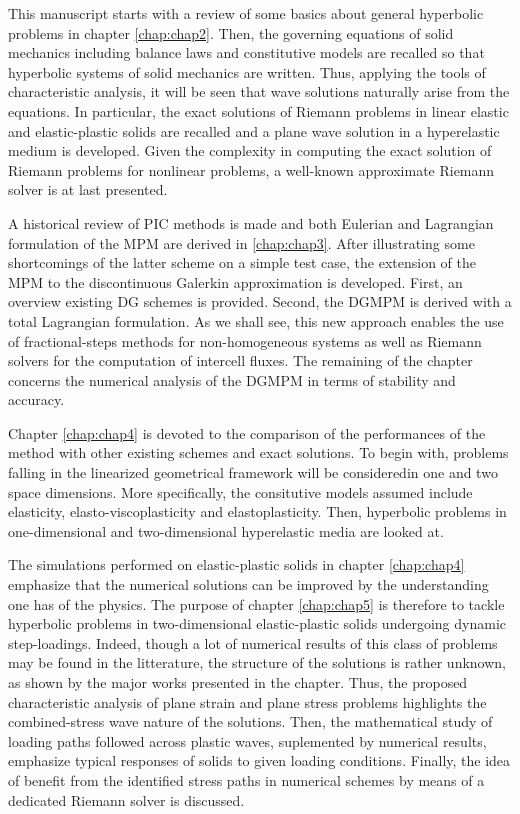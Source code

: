 This manuscript starts with a review of some basics about general hyperbolic problems in chapter \ref{chap:chap2}.
Then, the governing equations of solid mechanics including balance laws and constitutive models are recalled so that hyperbolic systems of solid mechanics are written.
Thus, applying the tools of characteristic analysis, it will be seen that wave solutions naturally arise from the equations. %
In particular, the exact solutions of Riemann problems in linear elastic and elastic-plastic solids are recalled and a plane wave solution in a hyperelastic medium is developed.
Given the complexity in computing the exact solution of Riemann problems for nonlinear problems, a well-known approximate Riemann solver is at last presented.


A historical review of PIC methods is made and both Eulerian and Lagrangian formulation of the MPM are derived in \ref{chap:chap3}.
After illustrating some shortcomings of the latter scheme on a simple test case, the extension of the MPM to the discontinuous Galerkin approximation is developed.
First, an overview existing DG schemes is provided.
Second, the DGMPM is derived with a total Lagrangian formulation.
As we shall see, this new approach enables the use of fractional-steps methods for non-homogeneous systems as well as Riemann solvers for the computation of intercell fluxes.
The remaining of the chapter concerns the numerical analysis of the DGMPM in terms of stability and accuracy.


Chapter \ref{chap:chap4} is devoted to the comparison of the performances of the method with other existing schemes and exact solutions.
To begin with, problems falling in the linearized geometrical framework will be consideredin one and two space dimensions.
More specifically, the consitutive models assumed include elasticity, elasto-viscoplasticity and elastoplasticity.
Then, hyperbolic problems in one-dimensional and two-dimensional hyperelastic media are looked at.

The simulations performed on elastic-plastic solids in chapter \ref{chap:chap4} emphasize that the numerical solutions can be improved by the understanding one has of the physics.
The purpose of chapter \ref{chap:chap5} is therefore to tackle hyperbolic problems in two-dimensional elastic-plastic solids undergoing dynamic step-loadings. 
Indeed, though a lot of numerical results of this class of problems may be found in the litterature, the structure of the solutions is rather unknown, as shown by the major works presented in the chapter. 
Thus, the proposed characteristic analysis of plane strain and plane stress problems highlights the combined-stress wave nature of the solutions.
Then, the mathematical study of loading paths followed across plastic waves, suplemented by numerical results, emphasize typical responses of solids to given loading conditions.
Finally, the idea of benefit from the identified stress paths in numerical schemes by means of a dedicated Riemann solver is discussed.


